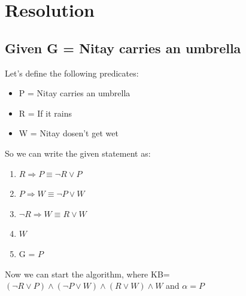 \documentclass{article}
\begin{document}
\section{Resolution}

\subsection{Given G = Nitay carries an umbrella}
Let's define the following predicates:
\begin{itemize}
    \item P = Nitay carries an umbrella
    \item R = If it rains
    \item W = Nitay dosen't get wet
\end{itemize}
So we can write the given statement as:
\begin{enumerate}
    \item $R \Rightarrow P \equiv \neg R \lor P$ 
    \item $P \Rightarrow W \equiv \neg P \lor W$
    \item $\neg R \Rightarrow W \equiv R \lor W$
    \item $ W$
    \item G = $P$
\end{enumerate}
Now we can start the algorithm, where KB=$(\neg R \lor P) \land (\neg P \lor W) \land (R \lor W) \land W$ and $\alpha =  P$\\
\end{document}
